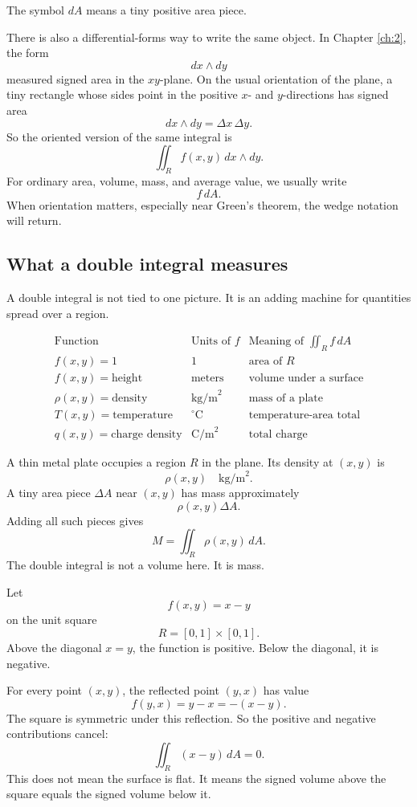 The symbol \(dA\) means a tiny positive area piece.

There is also a differential-forms way to write the same object.  In Chapter
\ref{ch:2}, the form
\[
    dx\wedge dy
\]
measured signed area in the \(xy\)-plane.  On the usual orientation of the plane, a tiny
rectangle whose sides point in the positive \(x\)- and \(y\)-directions has signed area
\[
    dx\wedge dy=\Delta x\,\Delta y.
\]
So the oriented version of the same integral is
\[
\boxed{
    \iint_R f(x,y)\,dx\wedge dy.
}
\]
For ordinary area, volume, mass, and average value, we usually write
\[
    f\,dA.
\]
When orientation matters, especially near Green's theorem, the wedge notation will
return.

\subsection{What a double integral measures}

A double integral is not tied to one picture.  It is an adding machine for quantities
spread over a region.

\[
\begin{array}{c|c|c}
\text{Function} & \text{Units of } f & \text{Meaning of } \displaystyle\iint_R f\,dA \\ \hline
f(x,y)=1 & 1 & \text{area of }R\\[1mm]
f(x,y)=\text{height} & \text{meters} & \text{volume under a surface}\\[1mm]
\rho(x,y)=\text{density} & \text{kg/m}^2 & \text{mass of a plate}\\[1mm]
T(x,y)=\text{temperature} & ^\circ\text{C} & \text{temperature-area total}\\[1mm]
q(x,y)=\text{charge density} & \text{C/m}^2 & \text{total charge}
\end{array}
\]

\begin{example}
A thin metal plate occupies a region \(R\) in the plane.  Its density at \((x,y)\) is
\[
    \rho(x,y)\quad \text{kg/m}^2.
\]
A tiny area piece \(\Delta A\) near \((x,y)\) has mass approximately
\[
    \rho(x,y)\Delta A.
\]
Adding all such pieces gives
\[
\boxed{
    M=\iint_R \rho(x,y)\,dA.
}
\]
The double integral is not a volume here.  It is mass.
\end{example}

\begin{example}
Let
\[
    f(x,y)=x-y
\]
on the unit square
\[
    R=[0,1]\times[0,1].
\]
Above the diagonal \(x=y\), the function is positive.  Below the diagonal, it is
negative.

For every point \((x,y)\), the reflected point \((y,x)\) has value
\[
    f(y,x)=y-x=-(x-y).
\]
The square is symmetric under this reflection.  So the positive and negative
contributions cancel:
\[
\boxed{
    \iint_R (x-y)\,dA=0.
}
\]
This does not mean the surface is flat.  It means the signed volume above the square
equals the signed volume below it.
\end{example}

